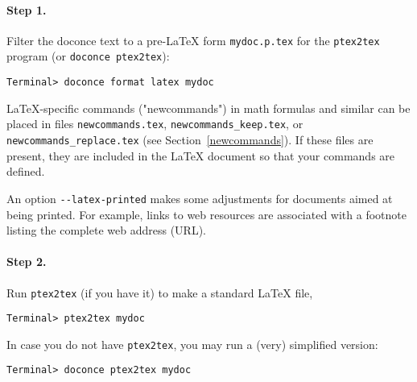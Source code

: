 \documentclass[twoside]{article}
\begin{document}
\paragraph{Step 1.}
Filter the doconce text to a pre-LaTeX form {\fontsize{10pt}{10pt}\verb!mydoc.p.tex!} for
the {\fontsize{10pt}{10pt}\verb!ptex2tex!} program (or {\fontsize{10pt}{10pt}\verb!doconce ptex2tex!}):
\vspace{4pt}
\begin{Verbatim}[numbers=none,frame=lines,label=\fbox{{\tiny Terminal}},fontsize=\fontsize{9pt}{9pt},
labelposition=topline,framesep=2.5mm,framerule=0.7pt]
Terminal> doconce format latex mydoc
\end{Verbatim}
LaTeX-specific commands ("newcommands") in math formulas and similar
can be placed in files {\fontsize{10pt}{10pt}\verb!newcommands.tex!}, {\fontsize{10pt}{10pt}\verb!newcommands_keep.tex!}, or
{\fontsize{10pt}{10pt}\verb!newcommands_replace.tex!} (see Section~\ref{newcommands}).
If these files are present, they are included in the {\LaTeX} document
so that your commands are defined.

An option {\fontsize{10pt}{10pt}\verb!--latex-printed!} makes some adjustments for documents
aimed at being printed. For example, links to web resources are
associated with a footnote listing the complete web address (URL).

\paragraph{Step 2.}
Run {\fontsize{10pt}{10pt}\verb!ptex2tex!} (if you have it) to make a standard {\LaTeX} file,
\vspace{4pt}
\begin{Verbatim}[numbers=none,frame=lines,label=\fbox{{\tiny Terminal}},fontsize=\fontsize{9pt}{9pt},
labelposition=topline,framesep=2.5mm,framerule=0.7pt]
Terminal> ptex2tex mydoc
\end{Verbatim}
In case you do not have {\fontsize{10pt}{10pt}\verb!ptex2tex!}, you may run a (very) simplified version:
\vspace{4pt}
\begin{Verbatim}[numbers=none,frame=lines,label=\fbox{{\tiny Terminal}},fontsize=\fontsize{9pt}{9pt},
labelposition=topline,framesep=2.5mm,framerule=0.7pt]
Terminal> doconce ptex2tex mydoc
\end{Verbatim}
\end{document}
